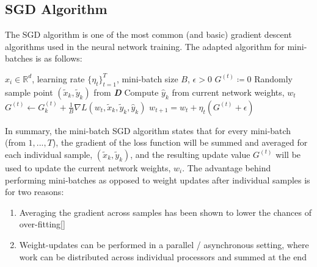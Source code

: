 \subsection{SGD Algorithm}

The SGD algorithm is one of the most common (and basic) gradient descent algorithms used in the neural network training. The adapted algorithm for mini-batches is as follows:
\vspace{14pt}
\begin{minipage}[b]{.48\textwidth}
\begin{algorithm}[H]\small
	\caption{$Mini-batch\:SGD$}
	\label{alg:SGD}
	\begin{algorithmic}
		 $x_i \in \mathbb{R}^d$, learning rate $\{\eta_t\}_{t=1}^T$, mini-batch size $B$, $\epsilon>0$
		\vspace{2pt}
		\vspace{2pt}
		\STATE $G^{(t)}\coloneqq 0$
		\vspace{2pt}
		    \vspace{2pt}
		    \STATE Randomly sample point $(\tilde x_k,\tilde y_k)$ from \textbf{\textit{D}}
		    \vspace{2pt}
		    \STATE Compute $\hat y_k$ from current network weights, $w_t$
		    \vspace{2pt}
		    \STATE $G^{(t)}\leftarrow G_k^{(t)} + \frac{1}{B}\nabla L(w_t,\tilde x_{k},\tilde y_k,\hat y_k)$
		    \vspace{4pt}
		\ENDFOR
		\vspace{2pt}
		\STATE $w_{t+1} = w_{t} + \eta_t (G^{(t)} + \epsilon)$
		\vspace{4pt}
		\ENDFOR
	\end{algorithmic}
\end{algorithm}
\end{minipage}\hfill
\vspace{-8pt}

In summary, the mini-batch SGD algorithm states that for every mini-batch (from $1,...,\textit{T}$), the gradient of the loss function will be summed and averaged for each individual sample, $(\tilde x_k,\tilde y_k)$, and the resulting update value $G^{(t)}$ will be used to update the current network weights, $w_i$. The advantage behind performing mini-batches as opposed to weight updates after individual samples is for two reasons:
\vspace{4pt}
\begin{enumerate}
    \item Averaging the gradient across samples has been shown to lower the chances of over-fitting[]
    \item Weight-updates can be performed in a parallel / asynchronous setting, where work can be distributed across individual processors and summed at the end
\end{enumerate}
\vspace{3pt}


